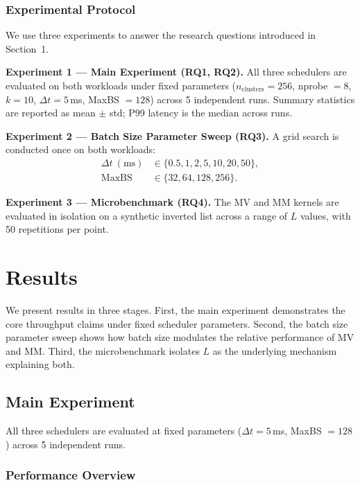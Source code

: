 \documentclass[sigconf, nonacm]{acmart}
\begin{document}
\subsubsection{Experimental Protocol}

We use three experiments to answer the research questions introduced in
Section~1.

\textbf{Experiment 1 --- Main Experiment (RQ1, RQ2).} All three
schedulers are evaluated on both workloads under fixed parameters
($n_\text{clusters} = 256$, nprobe $= 8$, $k = 10$,
$\Delta t = 5$\,ms, MaxBS $= 128$) across 5 independent runs. Summary
statistics are reported as mean $\pm$ std; P99 latency is the median
across runs.

\textbf{Experiment 2 --- Batch Size Parameter Sweep (RQ3).} A grid
search is conducted once on both workloads:
\[
\begin{array}{ll}
\Delta t\ \mathrm{(ms)} & \in \{0.5, 1, 2, 5, 10, 20, 50\}, \\
\mathrm{MaxBS}          & \in \{32, 64, 128, 256\}.
\end{array}
\]

\textbf{Experiment 3 --- Microbenchmark (RQ4).} The MV and MM kernels
are evaluated in isolation on a synthetic inverted list across a range
of $L$ values, with 50 repetitions per point.

\section{Results}

We present results in three stages. First, the main experiment
demonstrates the core throughput claims under fixed scheduler
parameters. Second, the batch size parameter sweep shows how batch size
modulates the relative performance of MV and MM. Third, the
microbenchmark isolates $L$ as the underlying mechanism explaining both.

\subsection{Main Experiment}

All three schedulers are evaluated at fixed parameters
($\Delta t = 5$\,ms, MaxBS $= 128$) across 5 independent runs.

\subsubsection{Performance Overview}
\end{document}
